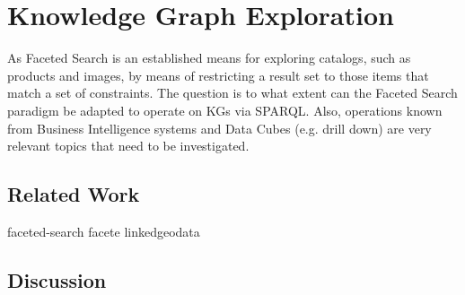 \chapter{Knowledge Graph Exploration}
As Faceted Search is an established means for exploring catalogs, such as products and images,
by means of restricting a result set to those items that match a set of constraints.
The question is to what extent can the Faceted Search paradigm be adapted to operate on KGs via SPARQL.
Also, operations known from Business Intelligence systems and Data Cubes (e.g. drill down) are very relevant topics
that need to be investigated.

\section{Related Work}

{faceted-search}
{facete}
{linkedgeodata}

\section{Discussion}
